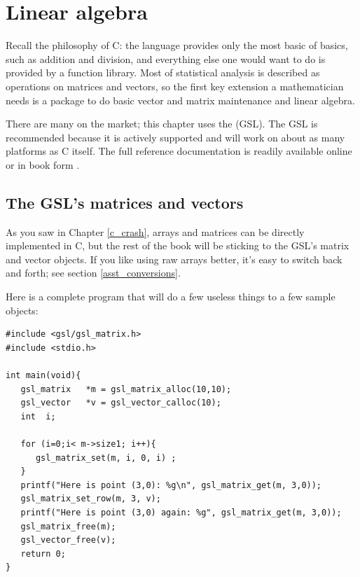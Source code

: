 \chapter[Linear Algebra]{Linear algebra} \label{linear_algebra} 

Recall the philosophy of C: the language provides only the most basic of
basics, such as addition and division, and everything else one would
want to do is provided by a function library. Most of statistical analysis is
described as operations on matrices and vectors, so the first key
extension a mathematician needs is a package to do basic vector and
matrix maintenance and linear algebra.

There are many on the market; this chapter uses the  (GSL). The GSL is recommended because it is actively supported
and will work on about as many platforms as C itself. The full reference
documentation is readily available online or in book form
\citep{gough:gsl}.

\section{The GSL's matrices and vectors}
As you saw in Chapter \ref{c_crash}, arrays and matrices can be directly implemented in C, but 
the rest of the book will be sticking to the GSL's matrix and vector objects.
If you like using raw arrays better, it's easy to switch back and forth; see
section \ref{asst_conversions}.


Here is a complete program that will do a few useless things to a few sample
objects:\label{gslexample}
\begin{lstlisting}
#include <gsl/gsl_matrix.h>
#include <stdio.h>

int main(void){
   gsl_matrix   *m = gsl_matrix_alloc(10,10);
   gsl_vector   *v = gsl_vector_calloc(10);
   int  i;

   for (i=0;i< m->size1; i++){
      gsl_matrix_set(m, i, 0, i) ;
   }
   printf("Here is point (3,0): %g\n", gsl_matrix_get(m, 3,0));
   gsl_matrix_set_row(m, 3, v);
   printf("Here is point (3,0) again: %g", gsl_matrix_get(m, 3,0));
   gsl_matrix_free(m);
   gsl_vector_free(v);
   return 0;
}
\end{lstlisting}
